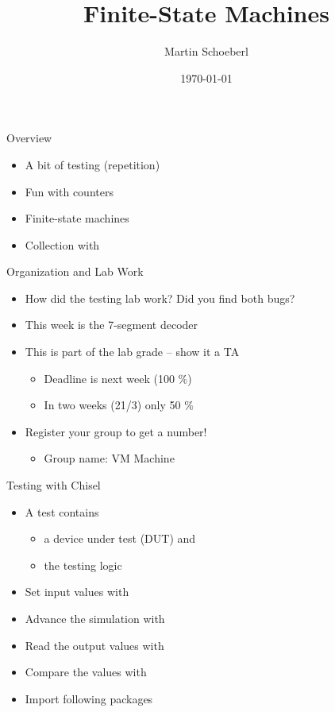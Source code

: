 

\newif\ifbook


\title{Finite-State Machines}
\author{Martin Schoeberl}
\date{\today}



\begin{frame}
\titlepage
\end{frame}


\begin{frame}[fragile]{Overview}
\begin{itemize}
\item A bit of testing (repetition)
\item Fun with counters
\item Finite-state machines
\item Collection with 
\end{itemize}
\end{frame}

\begin{frame}[fragile]{Organization and Lab Work}
\begin{itemize}
\item How did the testing lab work? Did you find both bugs?
\item This week is the 7-segment decoder
\item This is part of the lab grade -- show it a TA
\begin{itemize}
\item Deadline is next week (100 \%)
\item In two weeks (21/3) only 50 \%
\end{itemize}
\item Register your group to get a number!
\begin{itemize}
\item Group name: VM Machine
\end{itemize}
\end{itemize}
\end{frame}

\begin{frame}[fragile]{Testing with Chisel}
\begin{itemize}
\item A test contains
\begin{itemize}
\item a device under test (DUT) and
\item the testing logic
\end{itemize}
\item Set input values with 
\item Advance the simulation with 
\item Read the output values with 
\item Compare the values with 
\item Import following packages
\end{itemize}
\end{frame}

